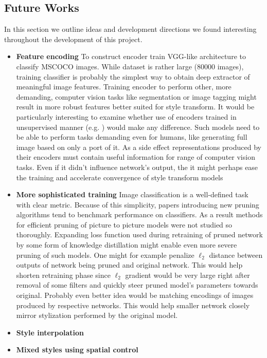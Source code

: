 \documentclass[../Main.tex]{subfiles}
\begin{document}
\subsection{Future Works}
In this section we outline ideas and development directions we found interesting
throughout the development of this project.
\begin{itemize}
\item \textbf{Feature encoding}
    To construct encoder \cite{Li2018} train VGG-like architecture to classify 
    MSCOCO images. While dataset is rather large (80000 images), training classifier
    is probably the simplest way to obtain deep extractor of meaningful image features.
    Training encoder to perform other, more demanding, computer vision tasks like 
    segmentation or image tagging might result in more robust features better suited
    for style transform. It would be particularly interesting to examine whether use of encoders
    trained in unsupervised manner (e.g. \cite{CPC, CPCv2}) would make any difference.
    Such models need to be able to perform tasks demanding even for humans, like generating
    full image based on only a port of it. As a side effect representations produced by their
    encoders must contain useful information for range of computer vision tasks.
    Even if it didn't influence network's output, the it might perhaps ease the training
    and accelerate convergence of style transform models
\item \textbf{More sophisticated training}
    Image classification is a well-defined task with clear metric.
    Because of this simplicity, papers introducing new pruning algorithms tend to 
    benchmark performance on classifiers. As a result methods for efficient pruning of
    picture to picture models were not studied so thoroughly. Expanding loss function used during
    retraining of pruned network by some form of knowledge distillation might enable
    even more severe pruning of such models. One might for example penalize $\ell_2$
    distance between outputs of network being pruned and original network.
    This would help shorten retraining phase since $\ell_2$ gradient
    would be very large right after removal of some filters and quickly steer pruned
    model's parameters towards original. Probably even better idea would be matching
    encodings of images produced by respective networks. This would help
    smaller network closely mirror stylization performed by the original model.
\item \textbf{Style interpolation}
\item \textbf{Mixed styles using spatial control}
    
    
\end{itemize}

\biblio %
\end{document}
